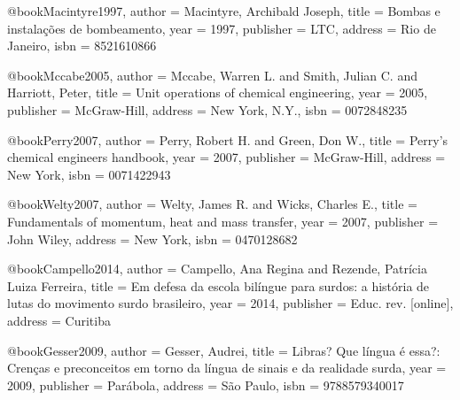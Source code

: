 @book{Macintyre1997,
  author = {Macintyre, Archibald Joseph},
  title = {Bombas e instalações de bombeamento},
  year = {1997},
  publisher = {LTC},
  address = {Rio de Janeiro},
  isbn = {8521610866}
}

@book{Mccabe2005,
  author = {Mccabe, Warren L. and Smith, Julian C. and Harriott, Peter},
  title = {Unit operations of chemical engineering},
  year = {2005},
  publisher = {McGraw-Hill},
  address = {New York, N.Y.},
  isbn = {0072848235}
}

@book{Perry2007,
  author = {Perry, Robert H. and Green, Don W.},
  title = {Perry's chemical engineers handbook},
  year = {2007},
  publisher = {McGraw-Hill},
  address = {New York},
  isbn = {0071422943}
}

@book{Welty2007,
  author = {Welty, James R. and Wicks, Charles E.},
  title = {Fundamentals of momentum, heat and mass transfer},
  year = {2007},
  publisher = {John Wiley},
  address = {New York},
  isbn = {0470128682}
}

%

@book{Campello2014,
  author = {Campello, Ana Regina and Rezende, Patrícia Luiza Ferreira},
  title = {Em defesa da escola bilíngue para surdos: a história de lutas do movimento surdo brasileiro},
  year = {2014},
  publisher = {Educ. rev. [online]},
  address = {Curitiba}
}

@book{Gesser2009,
  author = {Gesser, Audrei},
  title = {Libras? Que língua é essa?: Crenças e preconceitos em torno da língua de sinais e da realidade surda},
  year = {2009},
  publisher = {Parábola},
  address = {São Paulo},
  isbn = {9788579340017}
}

